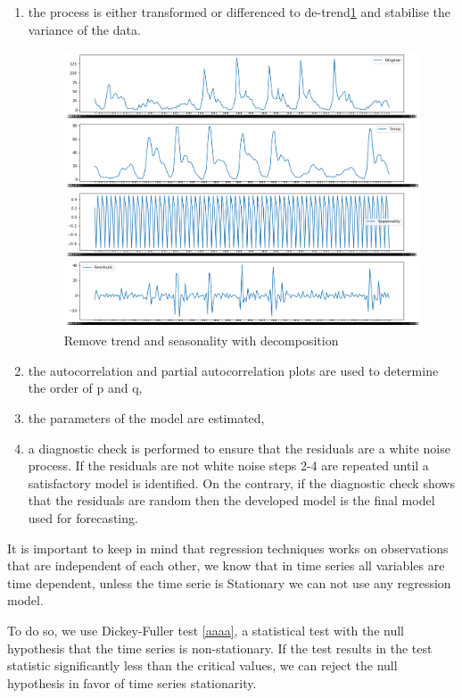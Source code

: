 \begin{enumerate}
    \item  the process is either transformed or
differenced to de-trend\ref{fig:detrend} and stabilise the variance of the data.
 

\begin{figure}[H]
\centering
\includegraphics[scale=.4]{img/detreding.png} 
\caption{Remove trend and seasonality with decomposition }
\label{fig:detrend}
\end{figure}

\item the autocorrelation and partial autocorrelation plots are used to determine the order of p and q,
\item the parameters of the model are estimated,
\item a diagnostic check is performed to ensure that the residuals are a white noise process. If the residuals are not white noise steps 2-4 are repeated until a satisfactory model is identified. On the contrary, if the diagnostic check shows that the residuals are random then the developed model is the final model used for forecasting.
\end{enumerate}

It is important to keep in mind that regression techniques works on  observations that are independent of each other, we know that in time series all variables are time dependent, unless the time serie is Stationary we can not use any regression model.

To do so, we use  Dickey-Fuller test \ref{aaaa}, a statistical test with the null hypothesis that the time series is non-stationary. If the test results in the test statistic significantly less than the critical values, we can reject the null hypothesis in favor of time series stationarity.

